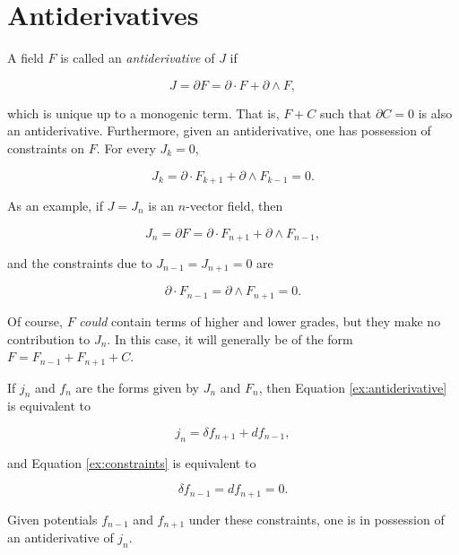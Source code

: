 \documentclass{article}
\begin{document}
\section{Antiderivatives}

A field $F$ is called an \emph{antiderivative} of $J$ if

\begin{equation}
  J = \partial F = \partial \cdot F + \partial \wedge F,\label{eq:antiderivative}
\end{equation}

which is unique up to a monogenic term. That is, $F + C$ such that $\partial C = 0$ is also an antiderivative. Furthermore, given an antiderivative, one has possession of constraints on $F$. For every $J_k = 0$,

\begin{equation}
  J_k = \partial \cdot F_{k+1} + \partial \wedge F_{k-1} = 0.\label{eq:constraints}
\end{equation}

As an example, if $J = J_n$ is an $n$-vector field, then 

\begin{equation}
  J_n = \partial F = \partial \cdot F_{n+1} + \partial \wedge F_{n-1},\label{ex:antiderivative}
\end{equation}

and the constraints due to $J_{n-1} = J_{n+1} = 0$ are

\begin{equation}
  \partial \cdot F_{n-1} = \partial \wedge F_{n+1} = 0.\label{ex:constraints}
\end{equation}

Of course, $F$ \emph{could} contain terms of higher and lower grades, but they make no contribution to $J_n$. In this case, it will generally be of the form $F = F_{n-1} + F_{n+1} + C$.

If $j_n$ and $f_n$ are the forms given by $J_n$ and $F_n$, then Equation \ref{ex:antiderivative} is equivalent to

\begin{equation}
  j_n = \delta f_{n+1} + d f_{n-1},
\end{equation}

and Equation \ref{ex:constraints} is equivalent to

\begin{equation}
  \delta f_{n-1} = d f_{n+1} = 0.
\end{equation}

Given potentials $f_{n-1}$ and $f_{n+1}$ under these constraints, one is in possession of an antiderivative of $j_n$.
\end{document}
